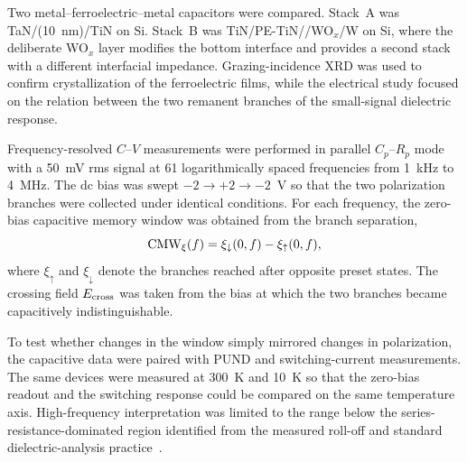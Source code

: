 Two metal--ferroelectric--metal capacitors were compared. Stack~A was TaN/\hzo{}(10~nm)/TiN on Si. Stack~B was TiN/PE-TiN/\hzo{}/WO$_x$/W on Si, where the deliberate WO$_x$ layer modifies the bottom interface and provides a second stack with a different interfacial impedance. Grazing-incidence XRD was used to confirm crystallization of the ferroelectric films, while the electrical study focused on the relation between the two remanent branches of the small-signal dielectric response.

Frequency-resolved $C$--$V$ measurements were performed in parallel $C_p$--$R_p$ mode with a 50~mV rms signal at 61 logarithmically spaced frequencies from 1~kHz to 4~MHz. The dc bias was swept $-2 \rightarrow +2 \rightarrow -2$~V so that the two polarization branches were collected under identical conditions. For each frequency, the zero-bias capacitive memory window was obtained from the branch separation,
\begin{equation}
\mathrm{CMW}_\xi(f)=\xi_\downarrow(0,f)-\xi_\uparrow(0,f),
\label{eq:cmw_short}
\end{equation}
where $\xi_\uparrow$ and $\xi_\downarrow$ denote the branches reached after opposite preset states. The crossing field $E_{\mathrm{cross}}$ was taken from the bias at which the two branches became capacitively indistinguishable.

To test whether changes in the window simply mirrored changes in polarization, the capacitive data were paired with PUND and switching-current measurements. The same devices were measured at 300~K and 10~K so that the zero-bias readout and the switching response could be compared on the same temperature axis. High-frequency interpretation was limited to the range below the series-resistance-dominated region identified from the measured roll-off and standard dielectric-analysis practice~\cite{nicollian1982,schroder2006}.
